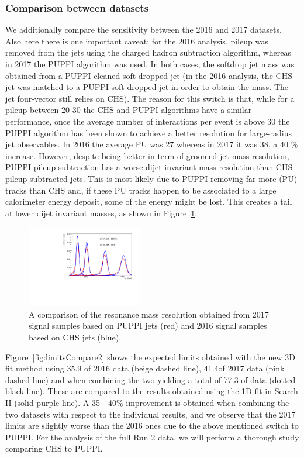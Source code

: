 \subsubsection{Comparison between datasets}
\label{sec:limitcomparedataset}
We additionally compare the sensitivity between the 2016 and 2017 datasets. Also here there is one important caveat: for the 2016 analysis, pileup was removed from the jets using the charged hadron subtraction algorithm, whereas in 2017 the PUPPI algorithm was used. In both cases, the softdrop jet mass was obtained from a PUPPI cleaned soft-dropped jet (in the 2016 analysis, the CHS jet was matched to a PUPPI soft-dropped jet in order to obtain the mass. The jet four-vector still relies on CHS). The reason for this switch is that, while for a pileup between 20-30 the CHS and PUPPI algorithms have a similar performance, once the average number of interactions per event is above 30 the PUPPI algorithm has been shown to achieve a better resolution for large-radius jet observables. In 2016 the average PU was 27 whereas in 2017 it was 38, a 40 \% increase. However, despite being better in term of groomed jet-mass resolution, PUPPI pileup subtraction has a worse dijet invariant mass resolution than CHS pileup subtracted jets. This is most likely due to PUPPI removing far more (PU) tracks than CHS and, if these PU tracks happen to be associated to a large calorimeter energy deposit, some of the energy might be lost. This creates a tail at lower dijet invariant masses, as shown in Figure~\ref{fig:puppiCHScompare}.
\begin{figure}[h!]
\centering
\includegraphics[width=0.45\textwidth]{figures/analysis/search3/AN-17-303/limits/comparison_studies/signal_testMjj_compYears.pdf}
\caption{A comparison of the resonance mass resolution obtained from 2017 signal samples based on PUPPI jets (red) and 2016 signal samples based on CHS jets (blue).}
\label{fig:puppiCHScompare}
\end{figure}
Figure~\ref{fig:limitsCompare2} shows the expected limits obtained with the new 3D fit method using 35.9 \fbinv of 2016 data (beige dashed line), 41.4\fbinv of 2017 data (pink dashed line) and when combining the two yielding a total of 77.3 \fbinv of data (dotted black line). These are compared to the results obtained using the 1D fit in Search II (solid purple line). A 35---40\% improvement is obtained when combining the two datasets with respect to the individual results, and we observe that the 2017 limits are slightly worse than the 2016 ones due to the above mentioned switch to PUPPI. For the analysis of the full Run 2 data, we will perform a thorough study comparing CHS to PUPPI.
